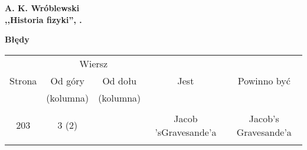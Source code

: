 \documentclass[a4paper,11pt]{article}
\newcommand{\spaceOne}{2em}
\newcommand{\tb}{\textbf}
\newcommand{\Center}[1]{\begin{center} #1 \end{center}}
\newcommand{\CenterTB}[1]{\Center{\tb{#1}}}
\newcommand{\Work}[1]{ \begin{center} {\large \tb{#1}} \end{center} }
\begin{document}
\vspace{\spaceOne}



\Work{
  A. K. Wróblewski \\
  ,,Historia fizyki'', \cite{Wro06}.}


\CenterTB{Błędy}
\begin{center}
  \begin{tabular}{|c|c|c|c|c|}
    \hline
    & \multicolumn{2}{c|}{Wiersz} & & \\ \cline{2-3}
    Strona & Od góry & Od dołu & Jest & Powinno być \\
    & (kolumna) & (kolumna) & & \\ \hline
    & & & & \\
    203 & 3 (2) & & Jacob 'sGravesande'a & Jacob's Gravesande'a \\
    & & & & \\ \hline
  \end{tabular}
\end{center}



 {}
\end{document}
